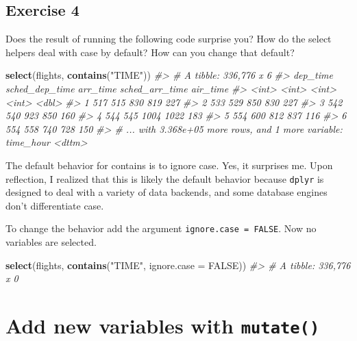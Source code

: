 \documentclass[]{book}
\newenvironment{Shaded}{\begin{snugshade}}{\end{snugshade}}
\newcommand{\CommentTok}[1]{\textcolor[rgb]{0.56,0.35,0.01}{\textit{#1}}}
\newcommand{\DataTypeTok}[1]{\textcolor[rgb]{0.13,0.29,0.53}{#1}}
\newcommand{\KeywordTok}[1]{\textcolor[rgb]{0.13,0.29,0.53}{\textbf{#1}}}
\newcommand{\NormalTok}[1]{#1}
\newcommand{\OtherTok}[1]{\textcolor[rgb]{0.56,0.35,0.01}{#1}}
\newcommand{\StringTok}[1]{\textcolor[rgb]{0.31,0.60,0.02}{#1}}
\theoremstyle{plain}
\theoremstyle{remark}
\theoremstyle{definition}
\theoremstyle{definition}
\theoremstyle{definition}
\theoremstyle{remark}
\begin{document}
\hypertarget{exercise-4-5}{%
\subsection{Exercise 4}\label{exercise-4-5}}

Does the result of running the following code surprise you? How do the
select helpers deal with case by default? How can you change that
default?

\begin{Shaded}
\begin{Highlighting}[]
\KeywordTok{select}\NormalTok{(flights, }\KeywordTok{contains}\NormalTok{(}\StringTok{"TIME"}\NormalTok{))}
\CommentTok{#> # A tibble: 336,776 x 6}
\CommentTok{#>   dep_time sched_dep_time arr_time sched_arr_time air_time}
\CommentTok{#>      <int>          <int>    <int>          <int>    <dbl>}
\CommentTok{#> 1      517            515      830            819      227}
\CommentTok{#> 2      533            529      850            830      227}
\CommentTok{#> 3      542            540      923            850      160}
\CommentTok{#> 4      544            545     1004           1022      183}
\CommentTok{#> 5      554            600      812            837      116}
\CommentTok{#> 6      554            558      740            728      150}
\CommentTok{#> # ... with 3.368e+05 more rows, and 1 more variable: time_hour <dttm>}
\end{Highlighting}
\end{Shaded}

The default behavior for contains is to ignore case. Yes, it surprises
me. Upon reflection, I realized that this is likely the default behavior
because \texttt{dplyr} is designed to deal with a variety of data
backends, and some database engines don't differentiate case.

To change the behavior add the argument \texttt{ignore.case\ =\ FALSE}.
Now no variables are selected.

\begin{Shaded}
\begin{Highlighting}[]
\KeywordTok{select}\NormalTok{(flights, }\KeywordTok{contains}\NormalTok{(}\StringTok{"TIME"}\NormalTok{, }\DataTypeTok{ignore.case =} \OtherTok{FALSE}\NormalTok{))}
\CommentTok{#> # A tibble: 336,776 x 0}
\end{Highlighting}
\end{Shaded}

\hypertarget{add-new-variables-with-mutate}{%
\section{\texorpdfstring{Add new variables with
\texttt{mutate()}}{Add new variables with mutate()}}\label{add-new-variables-with-mutate}}
\end{document}

